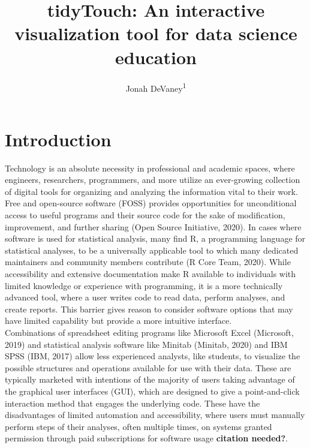 \documentclass[english,man,floatsintext]{apa6}
\author{Jonah DeVaney\textsuperscript{1}}
\affiliation{
\vspace{0.5cm}
\textsuperscript{1} East Tennesse State University}
\title{tidyTouch: An interactive visualization tool for data science education}
\date{}
\begin{document}
\maketitle

\hypertarget{introduction}{%
\section{Introduction}\label{introduction}}

Technology is an absolute necessity in professional and academic spaces, where engineers, researchers, programmers, and more utilize an ever-growing collection of digital tools for organizing and analyzing the information vital to their work. Free and open-source software (FOSS) provides opportunities for unconditional access to useful programs and their source code for the sake of modification, improvement, and further sharing (Open Source Initiative, 2020). In cases where software is used for statistical analysis, many find R, a programming language for statistical analyses, to be a universally applicable tool to which many dedicated maintainers and community members contribute (R Core Team, 2020). While accessibility and extensive documentation make R available to individuals with limited knowledge or experience with programming, it is a more technically advanced tool, where a user writes code to read data, perform analyses, and create reports. This barrier gives reason to consider software options that may have limited capability but provide a more intuitive interface.\\
Combinations of spreadsheet editing programs like Microsoft Excel (Microsoft, 2019) and statistical analysis software like Minitab (Minitab, 2020) and IBM SPSS (IBM, 2017) allow less experienced analysts, like students, to visualize the possible structures and operations available for use with their data. These are typically marketed with intentions of the majority of users taking advantage of the graphical user interfaces (GUI), which are designed to give a point-and-click interaction method that engages the underlying code. These have the disadvantages of limited automation and accessibility, where users must manually perform steps of their analyses, often multiple times, on systems granted permission through paid subscriptions for software usage \textbf{citation needed?}.\\
\end{document}
